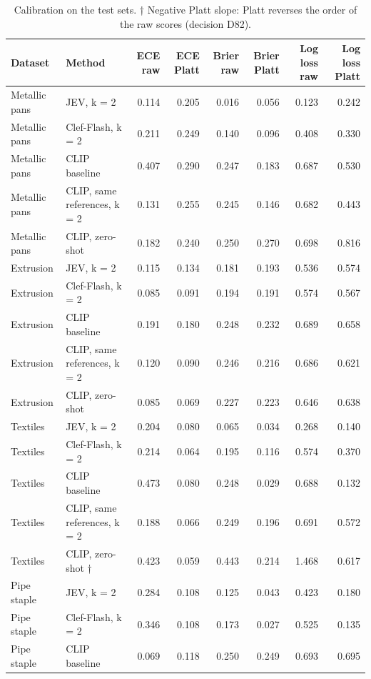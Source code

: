 \begin{table}

\caption{\label{tab:tbl-calibration}Calibration on the test sets. † Negative Platt slope: Platt reverses the order of the raw scores (decision D82).}
\centering
\begin{tabular}[t]{llrrrrrr}
\toprule
Dataset & Method & ECE raw & ECE Platt & Brier raw & Brier Platt & Log loss raw & Log loss Platt\\
\midrule
Metallic pans & JEV, k = 2 & 0.114 & 0.205 & 0.016 & 0.056 & 0.123 & 0.242\\
Metallic pans & Clef-Flash, k = 2 & 0.211 & 0.249 & 0.140 & 0.096 & 0.408 & 0.330\\
Metallic pans & CLIP baseline & 0.407 & 0.290 & 0.247 & 0.183 & 0.687 & 0.530\\
Metallic pans & CLIP, same references, k = 2 & 0.131 & 0.255 & 0.245 & 0.146 & 0.682 & 0.443\\
Metallic pans & CLIP, zero-shot & 0.182 & 0.240 & 0.250 & 0.270 & 0.698 & 0.816\\
\addlinespace
Extrusion & JEV, k = 2 & 0.115 & 0.134 & 0.181 & 0.193 & 0.536 & 0.574\\
Extrusion & Clef-Flash, k = 2 & 0.085 & 0.091 & 0.194 & 0.191 & 0.574 & 0.567\\
Extrusion & CLIP baseline & 0.191 & 0.180 & 0.248 & 0.232 & 0.689 & 0.658\\
Extrusion & CLIP, same references, k = 2 & 0.120 & 0.090 & 0.246 & 0.216 & 0.686 & 0.621\\
Extrusion & CLIP, zero-shot & 0.085 & 0.069 & 0.227 & 0.223 & 0.646 & 0.638\\
\addlinespace
Textiles & JEV, k = 2 & 0.204 & 0.080 & 0.065 & 0.034 & 0.268 & 0.140\\
Textiles & Clef-Flash, k = 2 & 0.214 & 0.064 & 0.195 & 0.116 & 0.574 & 0.370\\
Textiles & CLIP baseline & 0.473 & 0.080 & 0.248 & 0.029 & 0.688 & 0.132\\
Textiles & CLIP, same references, k = 2 & 0.188 & 0.066 & 0.249 & 0.196 & 0.691 & 0.572\\
Textiles & CLIP, zero-shot † & 0.423 & 0.059 & 0.443 & 0.214 & 1.468 & 0.617\\
\addlinespace
Pipe staple & JEV, k = 2 & 0.284 & 0.108 & 0.125 & 0.043 & 0.423 & 0.180\\
Pipe staple & Clef-Flash, k = 2 & 0.346 & 0.108 & 0.173 & 0.027 & 0.525 & 0.135\\
Pipe staple & CLIP baseline & 0.069 & 0.118 & 0.250 & 0.249 & 0.693 & 0.695\\

\end{tabular}
\end{table}
